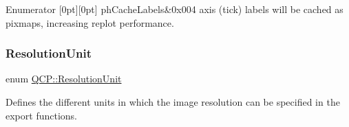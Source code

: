 \begin{DoxyEnumFields}{Enumerator}
[0pt][0pt]{}\mbox{\label{namespace_q_c_p_a5400e5fcb9528d92002ddb938c1f4ef4a8e9cfe5ee0c5cd36dd7accf9739aff65}} 
ph\+Cache\+Labels&{\ttfamily 0x004} axis (tick) labels will be cached as pixmaps, increasing replot performance. \\
\hline

\end{DoxyEnumFields}
\mbox{\label{namespace_q_c_p_a715d46153da230990aa887d0f0602452}} 
\subsubsection{\texorpdfstring{ResolutionUnit}{ResolutionUnit}}
{\footnotesize\ttfamily enum \mbox{\hyperlink{namespace_q_c_p_a715d46153da230990aa887d0f0602452}{Q\+C\+P\+::\+Resolution\+Unit}}}

Defines the different units in which the image resolution can be specified in the export functions.


